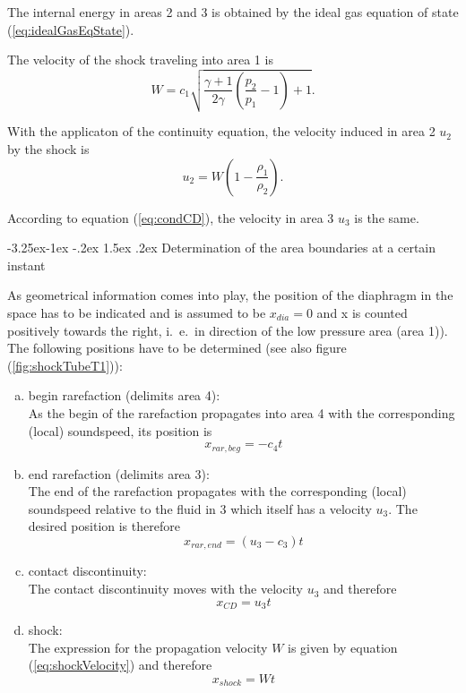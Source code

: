 \documentclass{report}
\makeatletter
\renewcommand\paragraph{\@startsection{paragraph}{4}{\z@}%
  {-3.25ex\@plus -1ex \@minus -.2ex}%
  {1.5ex \@plus .2ex}%
  {\normalfont\normalsize\bfseries}}
\makeatother
\begin{document}
The internal energy in areas 2 and 3 is obtained by the ideal gas equation of state (\ref{eq:idealGasEqState}).

The velocity of the shock traveling into area 1 is
\begin{equation}
\label{eq:shockVelocity}
W=c_1\sqrt{\frac{\gamma+1}{2\gamma}\left(\frac{p_2}{p_1}-1\right)+1}.
\end{equation}

With the applicaton of the continuity equation, the velocity induced in area 2 $u_2$ by the shock is
\begin{equation}
 u_2=W\left(1-\frac{\rho_1}{\rho_2}\right).
\end{equation}

According to equation (\ref{eq:condCD}), the velocity in area 3 $u_3$ is the same.

\paragraph{Determination of the area boundaries at a certain instant}

As geometrical information comes into play, the position of the diaphragm in the space has to be indicated and is assumed to be $x_{dia}=0$ and x is counted positively towards the right, i.\ e.\ in direction of the low pressure area (area 1)).
The following positions have to be determined (see also figure (\ref{fig:shockTubeT1})):

\begin{enumerate} [(a)]

  \item begin rarefaction (delimits area 4): \\
As the begin of the rarefaction propagates into area 4 with the corresponding (local) soundspeed, its position is 
\begin{equation}
 x_{rar,beg}=-c_4 t
\end{equation}

  \item end rarefaction (delimits area 3): \\
The end of the rarefaction propagates with the corresponding (local) soundspeed relative to the fluid in 3 which itself has a velocity $u_3$. The desired position is therefore
\begin{equation}
 x_{rar,end}=(u_3-c_3) t
\end{equation}

  \item contact discontinuity: \\
The contact discontinuity moves with the velocity $u_3$ and therefore
\begin{equation}
 x_{CD}=u_3 t
\end{equation}

  \item shock: \\
  The expression for the propagation velocity $W$ is given by equation (\ref{eq:shockVelocity}) and therefore
\begin{equation}
 x_{shock}=W t
\end{equation}

\end{enumerate}
\end{document}
